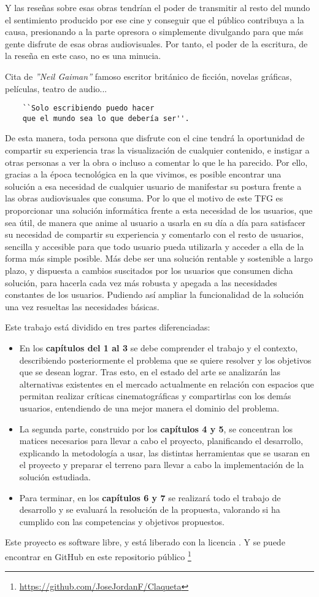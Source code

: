 Y las reseñas sobre esas obras tendrían el poder de transmitir al resto del mundo el sentimiento 
producido por ese cine y conseguir que el público contribuya a la causa, presionando a la parte 
opresora o simplemente divulgando para que más gente disfrute de esas obras audiovisuales. Por tanto, 
el poder de la escritura, de la reseña en este caso, no es una minucia.


Cita de \textit{''Neil Gaiman''}\cite{NeilG} famoso escritor británico de ficción, novelas gráficas,
películas, teatro de audio...
\begin{verbatim}
    ``Solo escribiendo puedo hacer 
    que el mundo sea lo que debería ser''.
\end{verbatim}

De esta manera, toda persona que disfrute con el cine tendrá la oportunidad de compartir su experiencia 
tras la visualización de cualquier contenido, e instigar a otras personas a ver la obra o incluso a 
comentar lo que le ha parecido. Por ello, gracias a la época tecnológica en la que vivimos, es posible 
encontrar una solución a esa necesidad de cualquier usuario de manifestar su postura frente a las obras 
audiovisuales que consuma. Por lo que el motivo de este TFG es proporcionar una solución informática 
frente a esta necesidad de los usuarios, que sea útil, de manera que anime al usuario a usarla en su 
día a día para satisfacer su necesidad de compartir su experiencia y comentarlo con el resto de 
usuarios, sencilla y accesible para que todo usuario pueda utilizarla y acceder a ella de la forma más 
simple posible. Más debe ser una solución rentable y sostenible a largo plazo, y dispuesta a cambios 
suscitados por los usuarios que consumen dicha solución, para hacerla cada vez más robusta y apegada a 
las necesidades constantes de los usuarios. Pudiendo así ampliar la funcionalidad de la solución una 
vez resueltas las necesidades básicas.

Este trabajo está dividido en tres partes diferenciadas:
\begin{itemize}
    \item En los \textbf{capítulos del 1 al 3} se debe comprender el trabajo y el contexto, describiendo 
    posteriormente el problema que se quiere resolver y los objetivos que se desean lograr. Tras esto, 
    en el estado del arte se analizarán las alternativas existentes en el mercado actualmente en 
    relación con espacios que permitan realizar críticas cinematográficas y compartirlas con los demás 
    usuarios, entendiendo de una mejor manera el dominio del problema.
    \item La segunda parte, construido por los \textbf{capítulos 4 y 5}, se concentran los matices 
    necesarios para llevar a cabo el proyecto, planificando el desarrollo, explicando la metodología a 
    usar, las distintas herramientas que se usaran en el proyecto y preparar el terreno para llevar a 
    cabo la implementación de la solución estudiada.
    \item Para terminar, en los \textbf{capítulos 6 y 7} se realizará todo el trabajo de desarrollo y se 
    evaluará la resolución de la propuesta, valorando si ha cumplido con las competencias y objetivos 
    propuestos.
\end{itemize}

Este proyecto es software libre, y está liberado con la licencia \cite{gplv3}. Y se puede encontrar en 
GitHub en este repositorio público \footnote{\url{https://github.com/JoseJordanF/Claqueta}}